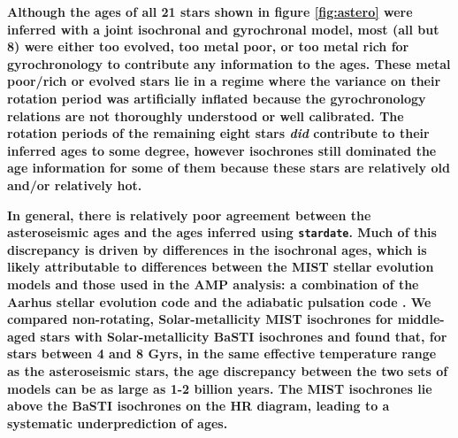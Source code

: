 \documentclass[useAMS, usenatbib, preprint, 12pt]{aastex}
\newcommand{\sd}{{\tt stardate}}
\newcommand{\racomment}[1]{{\bf #1}}
\begin{document}
\racomment{
Although the ages of all 21 stars shown in figure \ref{fig:astero} were
inferred with a joint isochronal and gyrochronal model, most (all but 8) were
either too evolved, too metal poor, or too metal rich for gyrochronology to
contribute any information to the ages.
These metal poor/rich or evolved stars lie in a regime where the variance on
their rotation period was artificially inflated because the gyrochronology
relations are not thoroughly understood or well calibrated.
The rotation periods of the remaining eight stars {\it did} contribute to
their inferred ages to some degree, however isochrones still dominated the age
information for some of them because these stars are relatively old and/or
relatively hot.
}

\racomment{
In general, there is relatively poor agreement between the asteroseismic ages
and the ages inferred using \sd.
Much of this discrepancy is driven by differences in the isochronal ages,
which is likely attributable to differences between the MIST stellar evolution
models and those used in the AMP analysis: a combination of the Aarhus stellar
evolution code \citep[ASTEC][]{christensen-dalsgaard2008a} and the adiabatic
pulsation code \citep[ADIPLS][]{christensen-dalsgaard2008b}.
We compared non-rotating, Solar-metallicity MIST isochrones for middle-aged
stars with Solar-metallicity BaSTI isochrones \citep{pietrinferni2004,
hidalgo2018} and found that, for stars between 4 and 8 Gyrs, in the same
effective temperature range as the asteroseismic stars, the age discrepancy
between the two sets of models can be as large as 1-2 billion years.
The MIST isochrones lie above the BaSTI isochrones on the HR diagram, leading
to a systematic underprediction of ages.
}
\end{document}
